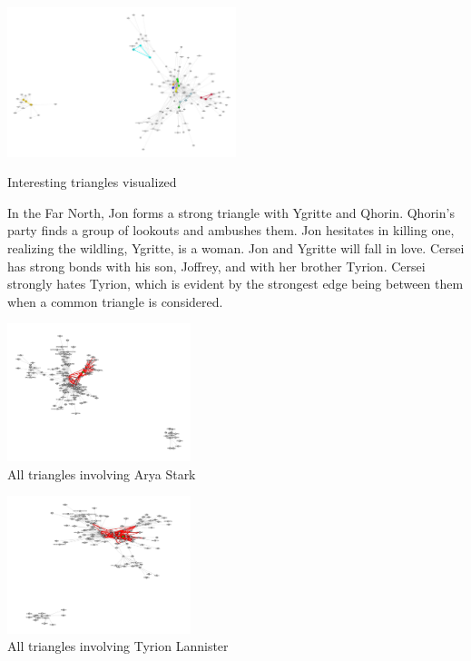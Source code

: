 \documentclass[10pt,twocolumn,letterpaper]{article}
\begin{document}
\begin{center}
    \includegraphics[width=0.5\textwidth]{img/s2/triangles.jpg}
    \caption{Interesting triangles visualized}
\end{center}


In the Far North, Jon forms a strong triangle with Ygritte and Qhorin. Qhorin's party finds a group of lookouts and ambushes them. Jon hesitates in killing one, realizing the wildling, Ygritte, is a woman. Jon and Ygritte will fall in love. 
Cersei has strong bonds with his son, Joffrey, and with her brother Tyrion. Cersei strongly hates Tyrion, which is evident by the strongest edge being between them when a common triangle is considered.



\begin{center}
    \includegraphics[width=0.4\textwidth]{img/s2/triangles_arya.jpg} \\
    \caption{All triangles involving Arya Stark}
\end{center}

\begin{center}
    \includegraphics[width=0.4\textwidth]{img/s2/triangles_tyrion.jpg} \\
    \caption{All triangles involving Tyrion Lannister}
\end{center}
\end{document}
